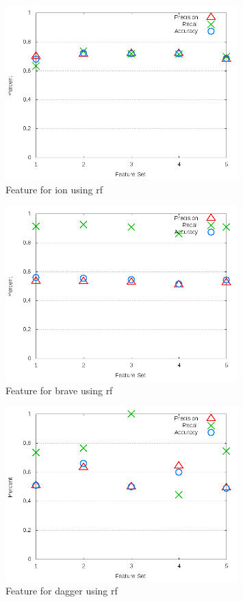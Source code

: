 \begin{figure}[!t]
\centering
\includegraphics[width=0.8\textwidth]{images/rf/test_3/ion_sample_range.png}
\caption{Feature for ion using \gls{rf}}
\label{fig:test_3_ion_rf}
\end{figure}

\begin{figure}[!t]
\centering
\includegraphics[width=0.8\textwidth]{images/rf/test_3/brave_sample_range.png}
\caption{Feature for brave using \gls{rf}}
\label{fig:test_3_brave_rf}
\end{figure}

\begin{figure}[!t]
\centering
\includegraphics[width=0.8\textwidth]{images/rf/test_3/dagger_sample_range.png}
\caption{Feature for dagger using \gls{rf}}
\label{fig:test_3_dagger_rf}
\end{figure}

